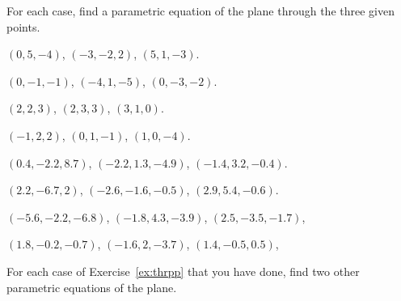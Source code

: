 \begin{exercise} \label{ex:thrpp} 
For each case, find a parametric equation of the plane through the three given points.
\begin{parts}
\item 
\((0,5,-4)\),
\((-3,-2,2)\),
\((5,1,-3)\).

\item
\((0,-1,-1)\),
\((-4,1,-5)\),
\((0,-3,-2)\).

\item 
\((2,2,3)\),
\((2,3,3)\),
\((3,1,0)\).

\item
\((-1,2,2)\),
\((0,1,-1)\),
\((1,0,-4)\).

\item
\((0.4,-2.2,8.7)\),
\((-2.2,1.3,-4.9)\),
\((-1.4,3.2,-0.4)\).

\item
\((2.2,-6.7,2)\),
\((-2.6,-1.6,-0.5)\),
\((2.9,5.4,-0.6)\).

\item
\((-5.6,-2.2,-6.8)\),
\((-1.8,4.3,-3.9)\),
\((2.5,-3.5,-1.7)\),

\item
\((1.8,-0.2,-0.7)\),
\((-1.6,2,-3.7)\),
\((1.4,-0.5,0.5)\),

\end{parts}
\end{exercise}


\begin{exercise} \label{ex:} 
For each case of Exercise~\ref{ex:thrpp} that you have done, find two other parametric equations of the plane.
\end{exercise}





\begin{comment}%
why, what caused X?
how did X occur?
what-if? what-if-not?
how does X compare with Y?
what is the evidence for X?
why is X important?
\end{comment}




